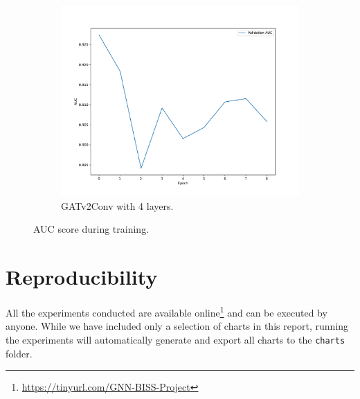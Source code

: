 \documentclass[11pt]{article}
\begin{document}
\begin{figure}
\begin{subfigure}{0.49\textwidth}
    \includegraphics[width=\textwidth]{figures/charts/GAT/auc-layerType_GATv2Conv-numLayers_4.pdf}
    \caption{GATv2Conv with 4 layers.}
    \label{fig:gat4}
  \end{subfigure}
  \caption{AUC score during training.}
  \label{fig:metrics}
\end{figure}

\section{Reproducibility}
All the experiments conducted are available 
%
online\footnote{\url{https://tinyurl.com/GNN-BISS-Project}} 
%
and can be executed by anyone. 
%
While we have included only a selection of charts in this report, running the 
%
experiments will automatically generate and export all charts to the \texttt{charts} folder.







\end{document}

